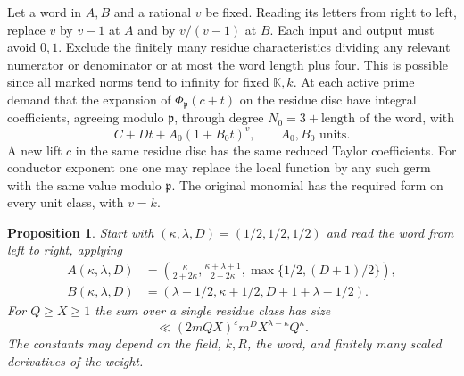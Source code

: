 \documentclass[11pt,letterpaper]{article}
\newtheorem{proposition}[proposition]{Proposition}
\theoremstyle{definition}
\numberwithin{equation}{section}
\begin{document}
Let a word in $A,B$ and a rational $v$ be fixed. Reading its letters
from right to left, replace $v$ by $v-1$ at $A$ and by $v/(v-1)$ at
$B$. Each input and output must avoid $0,1$. Exclude the finitely
many residue characteristics dividing any relevant numerator or
denominator or at most the word length plus four. This is possible
since all marked norms tend to infinity for fixed $\mathbb K,k$.
At each active prime demand that the expansion of
$\Phi_{\mathfrak p}(c+t)$ on the residue disc have integral
coefficients, agreeing modulo $\mathfrak p$, through degree
$N_0=3+\text{length of the word}$, with
\[
               C+Dt+A_0(1+B_0t)^v,\qquad A_0,B_0\text{ units}.
\]
A new lift $c$ in the same residue disc has the same reduced Taylor
coefficients. For conductor exponent one one may replace the local
function by any such germ with the same value modulo $\mathfrak p$.
The original monomial has the required form on every unit class,
with $v=k$.

\begin{proposition}\label{prop:nf-dual}
Start with $(\kappa,\lambda,D)=(1/2,1/2,1/2)$ and read the word
from left to right, applying
\begin{align*}
 A(\kappa,\lambda,D)
 &=\left(\frac{\kappa}{2+2\kappa},
          \frac{\kappa+\lambda+1}{2+2\kappa},
          \max\{1/2,(D+1)/2\}\right),\\
 B(\kappa,\lambda,D)
 &=\left(\lambda-1/2,\kappa+1/2,D+1+\lambda-1/2\right).
\end{align*}
For $Q\ge X\ge1$ the sum over a single residue class has size
\[
     \ll (2mQX)^\varepsilon m^D X^{\lambda-\kappa}Q^\kappa.
\]
The constants may depend on the field, $k,R$, the word, and
finitely many scaled derivatives of the weight.
\end{proposition}
\end{document}
